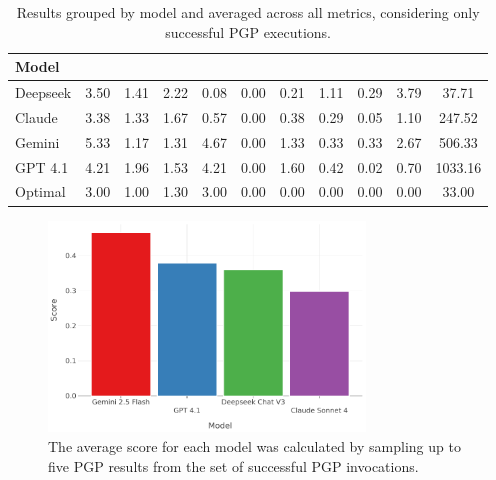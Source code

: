 \documentclass[12pt,a4paper,openright,twoside]{book}
\begin{document}
\begin{table}[htbp]
    \centering
    \footnotesize
    \begin{tabular}{l|ccccccccc|c}%
        \toprule
        \textbf{Model} & \PC{} & \CC{} & \PBC{} & \GC{} & \RR{} & \NGC{} & \NBC{} & \GSA{} & \BSA{} & \GAT{} \\  
        \midrule
        Deepseek & 3.50 & 1.41 & 2.22 & 0.08 & 0.00 & 0.21 & 1.11 & 0.29 & 3.79 & 37.71 \\
        Claude & 3.38 & 1.33 & 1.67 & 0.57 & 0.00 & 0.38 & 0.29 & 0.05 & 1.10 & 247.52 \\
        Gemini & 5.33 & 1.17 & 1.31 & 4.67 & 0.00 & 1.33 & 0.33 & 0.33 & 2.67 & 506.33 \\
        GPT 4.1 & 4.21 & 1.96 & 1.53 & 4.21 & 0.00 & 1.60 & 0.42 & 0.02 & 0.70 & 1033.16 \\
        \midrule
        Optimal & 3.00 & 1.00 & 1.30 & 3.00 & 0.00 & 0.00 & 0.00 & 0.00 & 0.00 & 33.00 \\
        \bottomrule
    \end{tabular}
    \caption{Results grouped by model and averaged across all metrics, considering only successful \ac{PGP} executions.}
    \label{tab:overallSuccessful}
\end{table}

\begin{figure}[htbp]
    \centering
    \includegraphics[width=0.75\textwidth]{figures/judge-eval.pdf}
    \caption{The average \PRAS{} score for each model was calculated by sampling up to five PGP results from the set of successful PGP invocations.}
    \label{fig:judge-eval}
\end{figure}
\end{document}
